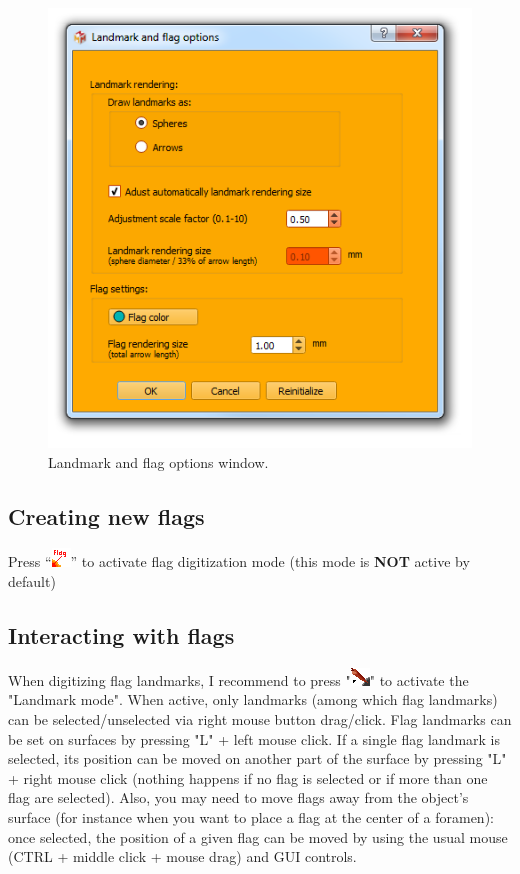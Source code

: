 \documentclass[12pt, a4paper]{book}
\begin{document}
\begin{figure}
  \centering
  \includegraphics[scale=0.55]{../images/08/landmark_flag_options.png} 
	\caption{Landmark and flag options window.}
\label{flag_rendering_options}
\end{figure}

\subsection{Creating new flags}

Press “\includegraphics[scale=0.7]{../images/04/flag_landmarks.png}” to activate flag digitization mode (this mode is \textbf{NOT} active by default)

\subsection{Interacting with flags}
When digitizing flag landmarks, I recommend to press "\includegraphics[scale=0.7]{../images/04/Landmarks2.png}" to activate the "Landmark mode". When active,
only landmarks (among which flag landmarks) can be selected/unselected via right mouse button drag/click. Flag landmarks can be set
on surfaces by pressing "L" + left mouse click.
 If a single flag landmark is selected, its position can be moved
on another part of the surface by pressing "L" + right mouse click (nothing happens if no flag
is selected or if more than one flag are selected). Also, you may need to move flags away
from the object’s surface (for instance when you want to place a flag at the center of a foramen):
once selected, the position of a given flag can be moved by using the usual mouse (CTRL + middle click + mouse drag) and GUI controls.\\
\end{document}
